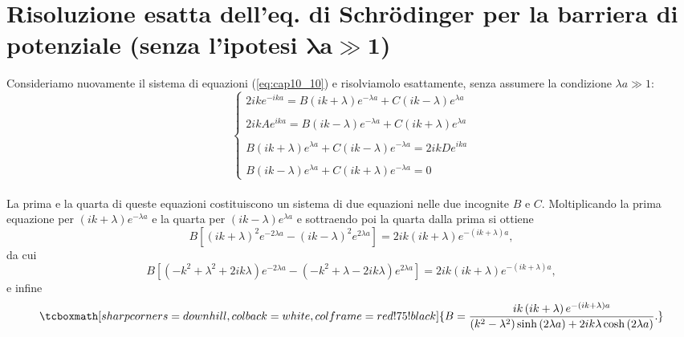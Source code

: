 \documentclass[a4paper,12pt,oneside]{book}
\begin{document}
\section{Risoluzione esatta dell'eq. di Schr\"{o}dinger per la barriera di potenziale (senza l'ipotesi $\mathbf{\lambda a \gg 1} $)}
Consideriamo nuovamente il sistema di equazioni (\ref{eq:cap10_10}) e risolviamolo esattamente, senza assumere la condizione $\lambda a \gg 1 $:
\begin{equation}
		\begin{cases}
		\displaystyle{2ike^{-ika}= B \left(ik+\lambda\right)e^{-\lambda a} +C \left(ik-\lambda\right)e^{\lambda a} }\\
		\\
		\displaystyle{2ikAe^{ika}= B \left(ik-\lambda\right)e^{-\lambda a} +C \left(ik+\lambda\right)e^{\lambda a} }\\
		\\
		\displaystyle{B\left(ik+\lambda\right)e^{\lambda a} + C\left(ik-\lambda\right)e^{-\lambda a} = 2ikD e^{ika}}\\
		\\
		\displaystyle{B\left(ik-\lambda\right)e^{\lambda a} + C\left(ik+\lambda\right)e^{-\lambda a} =0}
		\end{cases}
	\end{equation}\\

La prima e la quarta di queste equazioni costituiscono un sistema di due equazioni nelle due incognite $B$ e $C$. Moltiplicando la prima equazione per $(ik+\lambda) e^{-\lambda a }$ e la quarta per $(ik-\lambda) e^{\lambda a }$ e sottraendo poi la quarta dalla prima si ottiene
	\begin{equation}
		B\left[ (ik+\lambda)^2 e^{-2\lambda a }-(ik-\lambda)^2 e^{2\lambda a }\right]= 2ik(ik+\lambda) e^{-\left(ik+\lambda\right) a },
	\end{equation} 
da cui
	\begin{equation}
		B\left[ (-k^2+\lambda ^2+2ik\lambda) e^{-2\lambda a }-(-k^2+\lambda-2ik\lambda) e^{2\lambda a }\right]= 2ik(ik+\lambda) e^{-\left(ik+\lambda\right) a },
	\end{equation}
e infine
	\begin{equation}
		\tcboxmath[sharp corners=downhill, colback=white, colframe=red!75!black]{
			B=\frac{ik\left(ik+\lambda \right)e^{-\left(ik+\lambda\right) a }}{\left(k^2-\lambda^2\right)\sinh \left(2\lambda a\right)+2ik\lambda \cosh\left(2\lambda a\right)}.
			}
	\end{equation}\\
	
\end{document}
